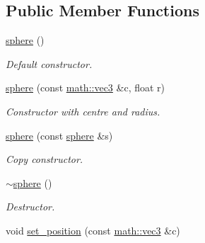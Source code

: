 \subsection*{Public Member Functions}
\begin{DoxyCompactItemize}
\item 
\mbox{\label{classphysim_1_1geometry_1_1sphere_a8e194f4cabf6e808d8b3aaad39b67bb0}} 
\hyperlink{classphysim_1_1geometry_1_1sphere_a8e194f4cabf6e808d8b3aaad39b67bb0}{sphere} ()
\begin{DoxyCompactList}\small\item\em Default constructor. \end{DoxyCompactList}\item 
\mbox{\label{classphysim_1_1geometry_1_1sphere_a1f97087e4cd42b62bcb870c28cc7c037}} 
\hyperlink{classphysim_1_1geometry_1_1sphere_a1f97087e4cd42b62bcb870c28cc7c037}{sphere} (const \hyperlink{structphysim_1_1math_1_1vec3}{math\+::vec3} \&c, float r)
\begin{DoxyCompactList}\small\item\em Constructor with centre and radius. \end{DoxyCompactList}\item 
\mbox{\label{classphysim_1_1geometry_1_1sphere_af9ac523eba8a60ccc42636768507924c}} 
\hyperlink{classphysim_1_1geometry_1_1sphere_af9ac523eba8a60ccc42636768507924c}{sphere} (const \hyperlink{classphysim_1_1geometry_1_1sphere}{sphere} \&s)
\begin{DoxyCompactList}\small\item\em Copy constructor. \end{DoxyCompactList}\item 
\mbox{\label{classphysim_1_1geometry_1_1sphere_ac41eead113dfd2c7002136d152204863}} 
\hyperlink{classphysim_1_1geometry_1_1sphere_ac41eead113dfd2c7002136d152204863}{$\sim$sphere} ()
\begin{DoxyCompactList}\small\item\em Destructor. \end{DoxyCompactList}\item 
void \hyperlink{classphysim_1_1geometry_1_1sphere_a85a3364712fdd23409dcf2cb2e574d09}{set\+\_\+position} (const \hyperlink{structphysim_1_1math_1_1vec3}{math\+::vec3} \&c)

\end{DoxyCompactItemize}
